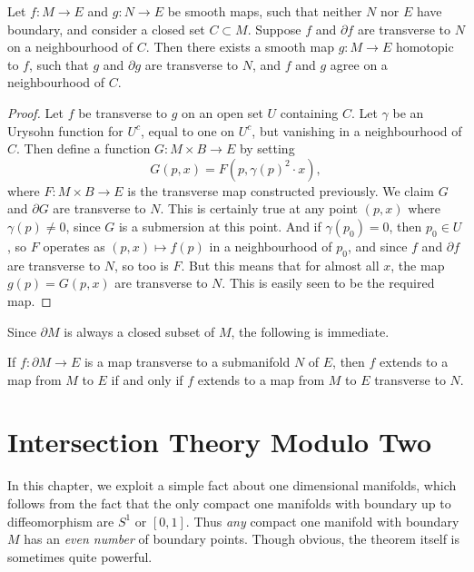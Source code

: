 \begin{theorem}
    Let $f: M \to E$  and $g: N \to E$ be smooth maps, such that neither $N$ nor $E$ have boundary, and consider a closed set $C \subset M$. Suppose $f$ and $\partial f$ are transverse to $N$ on a neighbourhood of $C$. Then there exists a smooth map $g: M \to E$ homotopic to $f$, such that $g$ and $\partial g$ are transverse to $N$, and $f$ and $g$ agree on a neighbourhood of $C$.
\end{theorem}
\begin{proof}
    Let $f$ be transverse to $g$ on an open set $U$ containing $C$. Let $\gamma$ be an Urysohn function for $U^c$, equal to one on $U^c$, but vanishing in a neighbourhood of $C$. Then define a function $G: M \times B \to E$ by setting
    \[ G(p,x) = F(p,\gamma(p)^2 \cdot x), \]
    where $F: M \times B \to E$ is the transverse map constructed previously. We claim $G$ and $\partial G$ are transverse to $N$. This is certainly true at any point $(p,x)$ where $\gamma(p) \neq 0$, since $G$ is a submersion at this point. And if $\gamma(p_0) = 0$, then $p_0 \in U$, so $F$ operates as $(p,x) \mapsto f(p)$ in a neighbourhood of $p_0$, and since $f$ and $\partial f$ are transverse to $N$, so too is $F$. But this means that for almost all $x$, the map $g(p) = G(p,x)$ are transverse to $N$. This is easily seen to be the required map.
\end{proof}

Since $\partial M$ is always a closed subset of $M$, the following is immediate.

\begin{corollary}
    If $f: \partial M \to E$ is a map transverse to a submanifold $N$ of $E$, then $f$ extends to a map from $M$ to $E$ if and only if $f$ extends to a map from $M$ to $E$ transverse to $N$.
\end{corollary}

\section{Intersection Theory Modulo Two}

In this chapter, we exploit a simple fact about one dimensional manifolds, which follows from the fact that the only compact one manifolds with boundary up to diffeomorphism are $S^1$ or $[0,1]$. Thus \emph{any} compact one manifold with boundary $M$ has an \emph{even number} of boundary points. Though obvious, the theorem itself is sometimes quite powerful.

